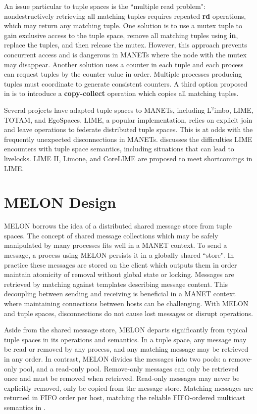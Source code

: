 \documentclass{llncs}
\begin{document}
An issue particular to tuple spaces is the ``multiple read problem": nondestructively retrieving all matching tuples requires repeated \textbf{rd} operations, which may return any matching tuple. One solution is to use a mutex tuple to gain exclusive access to the tuple space, remove all matching tuples using \textbf{in}, replace the tuples, and then release the mutex. However, this approach prevents concurrent access and is dangerous in MANETs where the node with the mutex may disappear. Another solution uses a counter in each tuple and each process can request tuples by the counter value in order. Multiple processes producing tuples must coordinate to generate consistent counters. A third option proposed in \cite{mrdp} is to introduce a \textbf{copy-collect} operation which copies all matching tuples.

Several projects have adapted tuple spaces to MANETs, including L$^{2}$imbo\cite{limbo}, LIME\cite{lime}, TOTAM\cite{totam}, and EgoSpaces\cite{egospaces}. LIME, a popular implementation, relies on explicit join and leave operations to federate distributed tuple spaces. This is at odds with the frequently unexpected disconnections in MANETs. \cite{limerevisted} discusses the difficulties LIME encounters with tuple space semantics, including situations that can lead to livelocks. LIME II\cite{lime2}, Limone\cite{limone}, and CoreLIME\cite{corelime} are proposed to meet shortcomings in LIME.

\section{MELON Design}\label{sec:design}

MELON borrows the idea of a distributed shared message store from tuple spaces. The concept of shared message collections which may be safely manipulated by many processes fits well in a MANET context. To send a message, a process using MELON persists it in a globally shared ``store".  In practice these messages are stored on the client which outputs them in order maintain atomicity of removal without global state or locking. Messages are retrieved by matching against templates describing message content. This decoupling between sending and receiving is beneficial in a MANET context where maintaining connections between hosts can be challenging. With MELON and tuple spaces, disconnections do not cause lost messages or disrupt operations.

Aside from the shared message store, MELON departs significantly from typical tuple spaces in its operations and semantics. In a tuple space, any message may be read or removed by any process, and any matching message may be retrieved in any order. In contrast, MELON divides the messages into two pools: a remove-only pool, and a read-only pool. Remove-only messages can only be retrieved once and must be removed when retrieved. Read-only messages may never be explicitly removed, only be copied from the message store. Matching messages are returned in FIFO order per host, matching the reliable FIFO-ordered multicast semantics in \cite{distbook}.
\end{document}
